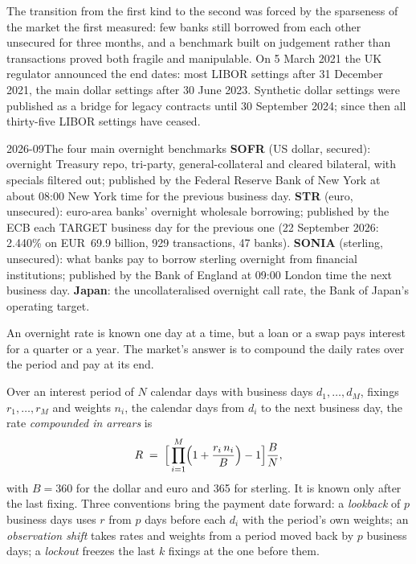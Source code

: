 The transition from the first kind to the second was forced by the sparseness
of the market the first measured: few banks still borrowed from each other
unsecured for three months, and a benchmark built on judgement rather than
transactions proved both fragile and manipulable. On 5 March 2021 the UK
regulator announced the end dates: most LIBOR settings after 31 December
2021, the main dollar settings after 30 June 2023. Synthetic dollar settings
were published as a bridge for legacy contracts until 30 September 2024;
since then all thirty-five LIBOR settings have ceased.

\begin{dated}{2026-09}{The four main overnight benchmarks}\label{dat:m2:central-banks-and-the-short-rate:benchmarks}
\textbf{SOFR} (US dollar, secured): overnight Treasury repo, tri-party,
general-collateral and cleared bilateral, with specials filtered out;
published by the Federal Reserve Bank of New York at about 08:00 New York
time for the previous business day. \textbf{\texteuro STR} (euro,
unsecured): euro-area banks' overnight wholesale borrowing; published by the
ECB each TARGET business day for the previous one (22 September 2026: 2.440\%
on EUR~69.9 billion, 929 transactions, 47 banks). \textbf{SONIA} (sterling,
unsecured): what banks pay to borrow sterling overnight from financial
institutions; published by the Bank of England at 09:00 London time the
next business day.
\textbf{Japan}: the uncollateralised overnight call rate, the Bank of Japan's
operating target.
\end{dated}

An overnight rate is known one day at a time, but a loan or a swap pays
interest for a quarter or a year. The market's answer is to compound the
daily rates over the period and pay at its end.

\begin{definition}\label{def:m2:central-banks-and-the-short-rate:arrears}
Over an interest period of $N$ calendar days with business days $d_1, \dots,
d_M$, fixings $r_1, \dots, r_M$ and weights $n_i$, the calendar days from
$d_i$ to the next business day, the rate \emph{compounded in
arrears} is
\[
R \;=\; \Bigl[\,\prod_{i=1}^{M}\Bigl(1 + \frac{r_i\,n_i}{B}\Bigr) - 1\Bigr]\frac{B}{N},
\]
with $B = 360$ for the dollar and euro and 365 for sterling. It is known only
after the last fixing. Three conventions bring the payment date forward: a
\emph{lookback} of $p$ business days uses $r$ from $p$ days before each $d_i$
with the period's own weights; an \emph{observation shift} takes rates and
weights from a period moved back by $p$ business days; a \emph{lockout}
freezes the last $k$ fixings at the one before them.
\end{definition}

